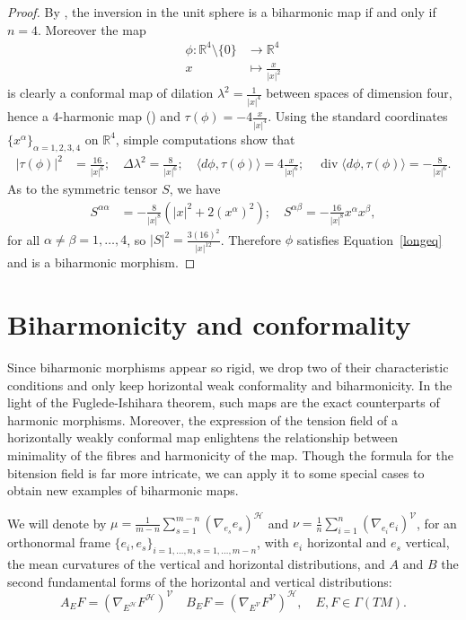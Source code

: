 \documentclass[12pt]{amsart}
\theoremstyle{plain}
\theoremstyle{definition}
\begin{document}
\begin{proof}
By \cite{B-K}, the inversion in the unit sphere is a biharmonic map if and only if
$n=4$. Moreover the map
\begin{align*}
\phi : {{\mathbb R}}^{4}\setminus\{0\} &\to {{\mathbb R}}^4 \\
x &\mapsto \frac{x}{|x|^2}
\end{align*}
is clearly a conformal map of dilation $\lambda^2 = \frac{1}{|x|^4}$ between spaces
of dimension four, hence a $4$-harmonic map (\cite{Ou}) and $\tau(\phi) = -4
\frac{x}{|x|^4}$. Using the standard coordinates $\{ x^{\alpha} \}_{\alpha =
1,2,3,4}$ on ${{\mathbb R}}^4$, simple computations show that
\begin{align*}
|\tau(\phi)|^2 &= \frac{16}{|x|^6} ; \quad \Delta \lambda^2 = \frac{8}{|x|^6} ; \quad
\langle d\phi,\tau(\phi)\rangle = 4\frac{x}{|x|^6} ; \quad \operatorname{div} \langle
d\phi,\tau(\phi)\rangle = -\frac{8}{|x|^6}.
\end{align*}
As to the symmetric tensor $S$, we have
\begin{align*}
S^{\alpha\alpha} &= -\tfrac{8}{|x|^8} \left( |x|^2 + 2 (x^{\alpha})^2 \right) ; \quad
S^{\alpha\beta} = -\tfrac{16}{|x|^8}  x^{\alpha}x^{\beta} ,
\end{align*}
for all $\alpha \neq \beta = 1,\dots,4$, so $|S|^2 = \tfrac{3 (16)^2}{|x|^{12}}$.
Therefore $\phi$ satisfies Equation~\eqref{longeq} and is a biharmonic morphism.
\end{proof}

\section{Biharmonicity and conformality}

Since biharmonic morphisms appear so rigid, we drop two of their characteristic
conditions and only keep horizontal weak conformality and biharmonicity. In the light of
the Fuglede-Ishihara theorem, such maps are the exact counterparts of harmonic
morphisms. Moreover, the expression of the tension field of a horizontally weakly
conformal map enlightens the relationship between minimality of the fibres and
harmonicity of the map. Though the formula for the bitension field is far more
intricate, we can apply it to some special cases to obtain new examples of
biharmonic maps.

We will denote by $\mu = \tfrac{1}{m-n} \sum_{s=1}^{m-n} (\nabla_{e_{s}} e_{s})^{\mathcal{H}}$
and $\nu= \tfrac{1}{n}\sum_{i=1}^{n} (\nabla_{e_{i}} e_{i})^{\mathcal{V}}$, for an orthonormal
frame $\{e_{i},e_{s}\}_{i=1,\dots,n, s=1,\dots,m-n}$, with $e_{i}$ horizontal and
$e_{s}$ vertical, the mean curvatures of the vertical and horizontal distributions,
and $A$ and $B$ the second fundamental forms of the horizontal and vertical
distributions:
$$ A_{E}F = (\nabla_{E^{\mathcal{H}}} F^{\mathcal{H}})^{\mathcal{V}} \quad B_{E}F = (\nabla_{E^{\mathcal{V}}}F^{\mathcal{V}})^{\mathcal{H}}, \quad E,F \in \Gamma(TM).$$
\end{document}
